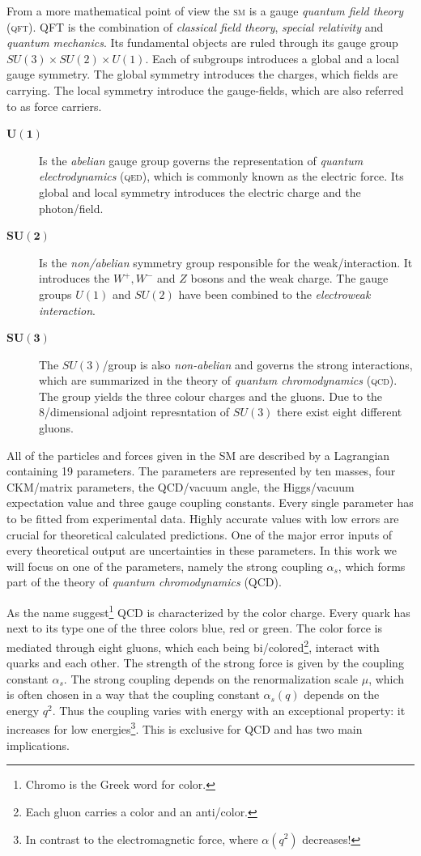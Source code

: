\documentclass[../../index.tex]{subfiles}
\begin{document}
From a more mathematical point of view the \textsc{sm} is a gauge \textit{quantum field theory} (\textsc{qft}). QFT is the
combination of \textit{classical field theory}, \textit{special relativity} and
\textit{quantum mechanics}. Its fundamental objects are ruled through its
gauge group $SU(3)\times SU(2)\times U(1)$. Each of subgroups introduces a
global and a local gauge symmetry. The global symmetry introduces the charges,
which fields are carrying. The local symmetry introduce the gauge-fields, which
are also referred to as force carriers. 
\begin{description}
  \item[$\bm{U(1)}$] Is the \textit{abelian} gauge group governs the representation of \textit{quantum
      electrodynamics} (\textsc{qed}), which is commonly known as the electric
    force. Its global and local symmetry introduces the electric charge and the
    photon\-/field.
  \item[$\bm{SU(2)}$] Is the \textit{non\-/abelian} symmetry group responsible
    for the weak\-/interaction. It introduces the $W^+,W^-$ and $Z$ bosons and
    the weak charge. The gauge groups $U(1)$ and $SU(2)$ have been combined to the \textit{electroweak interaction}.
  \item[$\bm{SU(3)}$] The $SU(3)$\-/group is also \textit{non-abelian} and
    governs the strong interactions, which are summarized in the theory of
    \textit{quantum chromodynamics} (\textsc{qcd}). The group yields the three
    colour charges and the gluons. Due to the 8\-/dimensional adjoint
    represntation of $SU(3)$ there exist eight different gluons.
\end{description}

All of the particles and forces given in the SM are described by a Lagrangian
containing 19 parameters. The parameters are represented by ten masses, four CKM\-/matrix parameters, the QCD\-/vacuum
angle, the Higgs\-/vacuum expectation value and three gauge coupling constants.
Every single parameter has to be fitted from experimental data. Highly accurate
values with low errors are crucial for theoretical calculated predictions. One
of the major error inputs of every theoretical output are uncertainties in these
parameters. In this work we will focus on one of the parameters, namely the
strong coupling $\alpha_s$, which forms part of the theory of
\textit{quantum chromodynamics} (QCD).

As the name suggest\footnote{Chromo is the Greek word for color.} QCD
is characterized by the color charge. Every quark has next to its type one
of the three colors blue, red or green. The color force is mediated through
eight gluons, which each being bi\-/colored\footnote{Each gluon carries a color
  and an anti\-/color.}, interact with quarks and each other. The strength of the
strong force is given by the coupling constant $\alpha_s$. The strong coupling
depends on the renormalization scale $\mu$, which is often chosen in a way that
the coupling constant $\alpha_s(q)$ depends on the energy $q^2$. Thus the
coupling varies with energy with an exceptional property: it increases for
low energies\footnote{In contrast to the electromagnetic force, where $\alpha(q^2)$
  decreases!}. This is exclusive for QCD and has two main implications.
\end{document}
